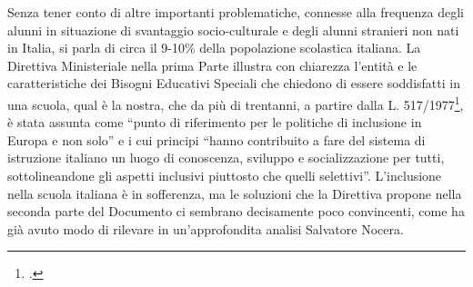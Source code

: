 Senza tener conto di altre importanti problematiche, connesse alla frequenza degli alunni in
situazione di svantaggio socio-culturale e degli alunni stranieri non nati in Italia, si parla di circa il
9-10\% della popolazione scolastica italiana.
La Direttiva Ministeriale nella prima Parte illustra con chiarezza l'entità e le caratteristiche dei
Bisogni Educativi Speciali che chiedono di essere soddisfatti in una scuola, qual è la nostra, che
da più di trentanni, a partire dalla L. 517/1977\footcite{Legge_517_77}, è stata assunta come “punto di riferimento per le
politiche di inclusione in Europa e non solo” e i cui principi “hanno contribuito a fare del sistema
di istruzione italiano un luogo di conoscenza, sviluppo e socializzazione per tutti, sottolineandone
gli aspetti inclusivi piuttosto che quelli selettivi”.
L'inclusione nella scuola italiana è in sofferenza, ma le soluzioni che la Direttiva propone nella
seconda parte del Documento ci sembrano decisamente poco convincenti, come ha già avuto
modo di rilevare in un'approfondita analisi Salvatore Nocera\pageref{cha:nocera310113}.

